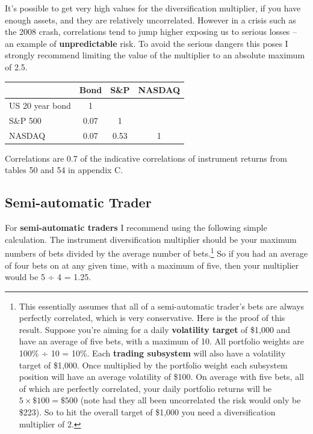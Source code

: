 It's possible to get very high values for the diversification multiplier, if you have enough assets, and they are relatively uncorrelated. However in a crisis such as the 2008 crash, correlations tend to jump higher exposing us to serious losses -- an example of \textbf{unpredictable} risk. To avoid the serious dangers this poses I strongly recommend limiting the value of the multiplier to an absolute maximum of 2.5.

 \begingroup \small \centering \begin{tabular}{@{} lccc@{}}
\toprule
& Bond & S\&P & NASDAQ \\
\midrule
US 20 year bond & 1 & & \\
S\&P 500 & 0.07 & 1 & \\
NASDAQ & 0.07 & 0.53 & 1 \\
\bottomrule
\end{tabular}
\par \endgroup

Correlations are 0.7 of the indicative correlations of instrument returns from tables 50 and 54 in appendix C.

\subsection*{Semi-automatic Trader}

For \textbf{semi-automatic traders} I recommend using the following simple calculation. The instrument diversification multiplier should be your maximum numbers of bets divided by the average number of bets.\footnote{This essentially assumes that all of a semi-automatic trader’s bets are always perfectly correlated, which is very conservative. Here is the proof of this result. Suppose you’re aiming for a daily \textbf{volatility target} of \$1,000 and have an average of five bets, with a maximum of 10. All portfolio weights are 100\% ÷ 10 = 10\%. Each \textbf{trading subsystem} will also have a volatility target of \$1,000. Once multiplied by the portfolio weight each subsystem position will have an average volatility of \$100. On average with five bets, all of which are perfectly correlated, your daily portfolio returns will be \(5 \times \$100 = \$500\) (note had they all been uncorrelated the risk would only be \$223). So to hit the overall target of \$1,000 you need a diversification multiplier of 2.} So if you had an average of four bets on at any given time, with a maximum of five, then your multiplier would be 5 ÷ 4 = 1.25.

